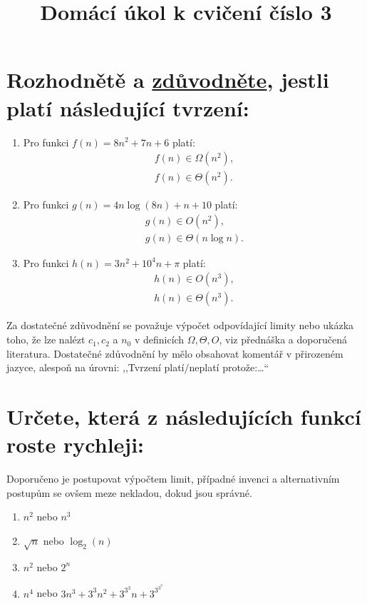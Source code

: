 \documentclass[12pt,oneside]{article}
\title{Domácí úkol k cvičení číslo 3}
\author{}
\begin{document}
	\maketitle
	\section{Rozhodnětě a \underline{zdůvodněte}, jestli platí následující tvrzení:}
		\begin{enumerate}
		\item Pro funkci $f(n) = 8n^2 + 7n + 6$ platí:
		\begin{align}
			f(n) \in \Omega(n^2), \\
			f(n) \in \Theta(n^2).
		\end{align}
		\item Pro funkci $g(n) = 4n\log(8n) + n + 10$ platí:
		\begin{align}
			g(n) \in O(n^2), \\
			g(n) \in \Theta(n\log n).
		\end{align}
		\item Pro funkci $h(n) = 3n^2 + 10^4n+  \pi $ platí:
		\begin{align}
			h(n) \in O(n^3) ,\\
			h(n) \in \Theta(n^3).
		\end{align}
	\end{enumerate}
	Za dostatečné zdůvodnění se považuje výpočet odpovídající limity nebo ukázka toho, že lze nalézt $c_1, c_2$ a $n_0$ v definicích $\Omega, \Theta, O$, viz přednáška a doporučená literatura.
	Dostatečné zdůvodnění by mělo obsahovat komentář v přirozeném jazyce, alespoň na úrovni: ,,Tvrzení platí/neplatí protože:\dots``
	
	\section{Určete, která z následujících funkcí roste rychleji:}
	Doporučeno je postupovat výpočtem limit, případné invenci a alternativním postupům se ovšem meze nekladou, dokud jsou správné.
	\begin{enumerate}
		\item $n^2$ nebo $n^3$
		\item $\sqrt{n}$ nebo $\log_2(n)$
		\item $n^2$ nebo $2^n$
		\item $n^4$ nebo $3n^3 + 3^3n^2 + 3^{3^3}n + 3^{3^{3^3}}$
	\end{enumerate}
	
\end{document}
